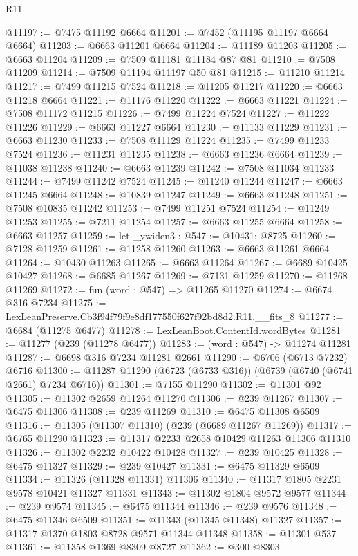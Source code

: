 \begin{lexlean}{R11}
\begin{coremodule}
@11197 := @7475 @11192 @6664
@11201 := @7452 (@11195 @11197 @6664 @6664)
@11203 := @6663 @11201 @6664
@11204 := @11189 @11203
@11205 := @6663 @11204
@11209 := @7509 @11181 @11184 @87 @81
@11210 := @7508 @11209
@11214 := @7509 @11194 @11197 @50 @81
@11215 := @11210 @11214
@11217 := @7499 @11215 @7524
@11218 := @11205 @11217
@11220 := @6663 @11218 @6664
@11221 := @11176 @11220
@11222 := @6663 @11221
@11224 := @7508 @11172 @11215
@11226 := @7499 @11224 @7524
@11227 := @11222 @11226
@11229 := @6663 @11227 @6664
@11230 := @11133 @11229
@11231 := @6663 @11230
@11233 := @7508 @11129 @11224
@11235 := @7499 @11233 @7524
@11236 := @11231 @11235
@11238 := @6663 @11236 @6664
@11239 := @11038 @11238
@11240 := @6663 @11239
@11242 := @7508 @11034 @11233
@11244 := @7499 @11242 @7524
@11245 := @11240 @11244
@11247 := @6663 @11245 @6664
@11248 := @10839 @11247
@11249 := @6663 @11248
@11251 := @7508 @10835 @11242
@11253 := @7499 @11251 @7524
@11254 := @11249 @11253
@11255 := @7211 @11254
@11257 := @6663 @11255 @6664
@11258 := @6663 @11257
@11259 := let _ywiden3 : @547 := @10431; @8725
@11260 := @7128 @11259
@11261 := @11258 @11260
@11263 := @6663 @11261 @6664
@11264 := @10430 @11263
@11265 := @6663 @11264
@11267 := @6689 @10425 @10427
@11268 := @6685 @11267
@11269 := @7131 @11259
@11270 := @11268 @11269
@11272 := fun (word : @547) => @11265 @11270
@11274 := @6674 @316 @7234
@11275 := LexLeanPreserve.Cb3f94f79f9e8df177550f627f92bd8d2.R11.__fits_8
@11277 := @6684 (@11275 @6477)
@11278 := LexLeanBoot.ContentId.wordBytes
@11281 := @11277 (@239 (@11278 @6477))
@11283 := (word : @547) -> @11274 @11281
@11287 := @6698 @316 @7234 @11281 @2661
@11290 := @6706 (@6713 @7232) @6716
@11300 := @11287 @11290 (@6723 (@6733 @316)) (@6739 (@6740 (@6741 @2661) @7234 @6716))
@11301 := @7155 @11290
@11302 := @11301 @92
@11305 := @11302 @2659 @11264 @11270
@11306 := @239 @11267
@11307 := @6475 @11306
@11308 := @239 @11269
@11310 := @6475 @11308 @6509
@11316 := @11305 (@11307 @11310) (@239 (@6689 @11267 @11269))
@11317 := @6765 @11290
@11323 := @11317 @2233 @2658 @10429 @11263 @11306 @11310
@11326 := @11302 @2232 @10422 @10428
@11327 := @239 @10425
@11328 := @6475 @11327
@11329 := @239 @10427
@11331 := @6475 @11329 @6509
@11334 := @11326 (@11328 @11331) @11306
@11340 := @11317 @1805 @2231 @9578 @10421 @11327 @11331
@11343 := @11302 @1804 @9572 @9577
@11344 := @239 @9574
@11345 := @6475 @11344
@11346 := @239 @9576
@11348 := @6475 @11346 @6509
@11351 := @11343 (@11345 @11348) @11327
@11357 := @11317 @1370 @1803 @8728 @9571 @11344 @11348
@11358 := @11301 @537
@11361 := @11358 @1369 @8309 @8727
@11362 := @300 @8303

\end{coremodule}
\end{lexlean}
